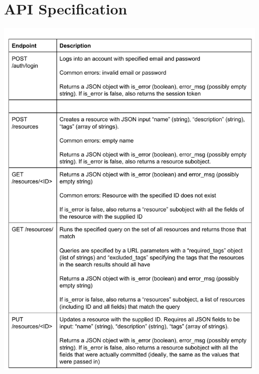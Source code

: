 \documentclass[12pt]{article}
\begin{document}
\section{API Specification}
\label{appendix:apispec}
\includegraphics[width=6in]{apispec_01.pdf}
\end{document}
